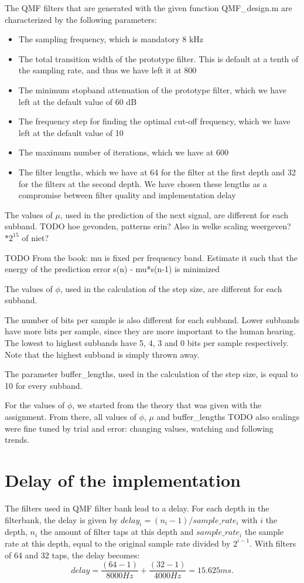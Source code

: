 \documentclass[a4paper]{article}
\begin{document}
The QMF filters that are generated with the given function QMF\_design.m are characterized by the following parameters:

\begin{itemize}
\item The sampling frequency, which is mandatory 8 kHz
\item The total transition width of the prototype filter. This is default at a tenth of the sampling rate, and thus we have left it at 800
\item The minimum stopband attenuation of the prototype filter, which we have left at the default value of 60 dB
\item The frequency step for finding the optimal cut-off frequency, which we have left at the default value of 10
\item The maximum number of iterations, which we have at 600
\item The filter lengths, which we have at 64 for the filter at the first depth and 32 for the filters at the second depth. We have chosen these lengths as a compromise between filter quality and implementation delay
\end{itemize}

The values of $\mu$, used in the prediction of the next signal, are different for each subband. TODO hoe gevonden, patterns erin? Also in welke scaling weergeven? $*2^15$ of niet?

TODO From the book: mu is fixed per frequency band. Estimate it such that the energy of the prediction error s(n) - mu*s(n-1) is minimized

The values of $\phi$, used in the calculation of the step size, are different for each subband. 

The number of bits per sample is also different for each subband. Lower subbands have more bits per sample, since they are more important to the human hearing. The lowest to highest subbands have 5, 4, 3 and 0 bits per sample respectively. Note that the highest subband is simply thrown away.

The parameter buffer\_lengths, used in the calculation of the step size, is equal to 10 for every subband.

For the values of $\phi$, we started from the theory that was given with the assignment. From there, all values of $\phi$, $\mu$ and buffer\_lengths TODO also scalings were fine tuned by trial and error: changing values, watching and following trends.

\section{Delay of the implementation}
The filters used in QMF filter bank lead to a delay. For each depth in the filterbank, the delay is given by $delay_i = (n_i-1) / sample\_rate_i$ with $i$ the depth, $n_i$ the amount of filter taps at this depth and $sample\_rate_i$ the sample rate at this depth, equal to the original sample rate divided by $2^{i-1}$. With filters of 64 and 32 taps, the delay becomes:
\begin{equation*}
delay = \frac{(64-1)}{8000 Hz} + \frac{(32-1)}{4000 Hz} = 15.625 ms.
\end{equation*}
\end{document}
